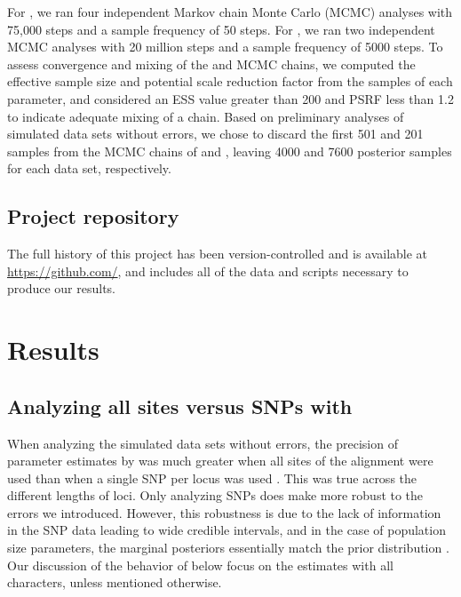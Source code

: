 For \ecoevolity, we ran four independent Markov chain Monte Carlo (MCMC)
analyses with 75,000 steps and a sample frequency of 50 steps.
For \beast, we ran two independent MCMC analyses with 20 million steps and a
sample frequency of 5000 steps. 
To assess convergence and mixing of the \ecoevolity and \beast MCMC chains, we
computed the effective sample size
\citep[ESS;][]{Gong2014}
and potential scale reduction factor
\citep[PSRF; the square root of Equation 1.1 in][]{Brooks1998}
from the samples of each parameter, and considered an ESS value greater
than 200 and PSRF less than 1.2 \citep{gelman1998} to indicate adequate mixing
of a chain. 
Based on preliminary analyses of simulated data sets without errors,
we chose to discard the first 501 and 201 samples from
the MCMC chains of \ecoevolity and \beast, leaving 4000 and
7600 posterior samples for each data set, respectively.


\subsection{Project repository}
The full history of this project has been version-controlled and is available
at
\url{https://github.com/},
and includes
all of the data and scripts necessary to produce our results.


\section{Results}

\subsection{Analyzing all sites versus SNPs with \ecoevolity}
When analyzing the simulated data sets without errors, the precision of
parameter estimates by \ecoevolity was much greater when all sites of the
alignment were used than when a single SNP per locus was used \mainfigsp.
This was true across the different lengths of loci.
Only analyzing SNPs does make \ecoevolity more robust to the errors
we introduced.
However, this robustness is due to the lack of information in the
SNP data leading to wide credible intervals, and in the case of
population size parameters, the marginal posteriors essentially
match the prior distribution \thetafigsp.
Our discussion of the behavior of \ecoevolity below focus on the estimates with
all characters, unless mentioned otherwise.

